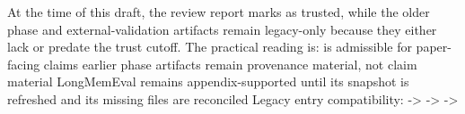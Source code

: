 \markdownRendererUlItem {}\markdownRendererUlItemEnd 
\markdownRendererUlItem {}\markdownRendererUlItemEnd 
\markdownRendererUlEndTight \markdownRendererInterblockSeparator
{}
\markdownRendererSectionEnd \markdownRendererSectionBegin
{}\markdownRendererInterblockSeparator
{}At the time of this draft, the review report marks  as trusted, while the older phase and external-validation artifacts remain legacy-only because they either lack  or predate the trust cutoff.\markdownRendererParagraphSeparator
{}The practical reading is:\markdownRendererInterblockSeparator
{}\markdownRendererUlBeginTight
\markdownRendererUlItem {} is admissible for paper-facing claims\markdownRendererUlItemEnd 
\markdownRendererUlItem earlier phase artifacts remain provenance material, not claim material\markdownRendererUlItemEnd 
\markdownRendererUlItem LongMemEval remains appendix-supported until its snapshot is refreshed and its missing files are reconciled\markdownRendererUlItemEnd 
\markdownRendererUlEndTight \markdownRendererInterblockSeparator
{}Legacy entry compatibility:\markdownRendererInterblockSeparator
{}\markdownRendererUlBeginTight
\markdownRendererUlItem {} -> \markdownRendererUlItemEnd 
\markdownRendererUlItem {} -> \markdownRendererUlItemEnd 
\markdownRendererUlItem {} -> \markdownRendererUlItemEnd 
